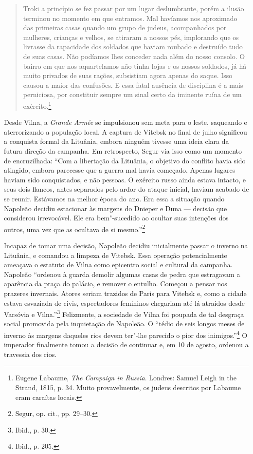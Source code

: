 \begin{quote}
Troki a princípio se fez passar por um lugar deslumbrante, porém a
ilusão terminou no momento em que entramos. Mal havíamos nos aproximado
das primeiras casas quando um grupo de judeus, acompanhados por
mulheres, crianças e velhos, se atiraram a nossos pés, implorando que os
livrasse da rapacidade dos soldados que haviam roubado e destruído tudo
de suas casas. Não podíamos lhes conceder nada além do nosso consolo. O
bairro em que nos aquartelamos não tinha lojas e os nossos soldados, já
há muito privados de suas rações, subsistiam agora apenas do saque. Isso
causou a maior das confusões. E essa fatal ausência de disciplina é a
mais perniciosa, por constituir sempre um sinal certo da iminente ruína
de um exército.\footnote{Eugene Labaume, \textit{The Campaign in Russia}. Londres: Samuel Leigh in the Strand, 1815, p. 34. Muito provavelmente, os judeus descritos por Labaume eram caraítas locais.} 
\end{quote}

Desde Vilna, a \textit{Grande Armée} se impulsionou sem meta para o leste,
saqueando e aterrorizando a população local. A captura de Vitebsk no
final de julho significou a conquista formal da Lituânia, embora ninguém
tivesse uma ideia clara da futura direção da campanha. Em retrospecto,
Segur via isso como um momento de encruzilhada: ``Com a libertação da
Lituânia, o objetivo do conflito havia sido atingido, embora parecesse
que a guerra mal havia começado. Apenas lugares haviam sido
conquistados, e não pessoas. O exército russo ainda estava intacto, e
seus dois flancos, antes separados pelo ardor do ataque inicial, haviam
acabado de se reunir. Estávamos na melhor época do ano. Era essa a
situação quando Napoleão decidiu estacionar às margens do Dnieper e Duna
--- decisão que considerou irrevocável. Ele era bem"-sucedido ao ocultar
suas intenções dos outros, uma vez que as ocultava de si
mesmo.''\footnote{Segur, op. cit., pp. 29--30.}

Incapaz de tomar uma decisão, Napoleão decidiu inicialmente passar o
inverno na Lituânia, e comandou a limpeza de Vitebsk. Essa operação
potencialmente ameaçava o estatuto de Vilna como epicentro social e
cultural da campanha. Napoleão ``ordenou à guarda demolir algumas casas
de pedra que estragavam a aparência da praça do palácio, e remover o
entulho. Começou a pensar nos prazeres invernais. Atores seriam trazidos
de Paris para Vitebsk e, como a cidade estava esvaziada de civis,
espectadores femininos chegariam até lá atraídos desde Varsóvia e
Vilna.''\footnote{Ibid., p. 30.} Felizmente, a sociedade de Vilna foi
poupada de tal desgraça social promovida pela inquietação de Napoleão. O
``tédio de seis longos meses de inverno às margens daqueles rios devem
ter"-lhe parecido o pior dos inimigos.''\footnote{Ibid., p. 205.} O
imperador finalmente tomou a decisão de continuar e, em 10 de agosto,
ordenou a travessia dos rios.


